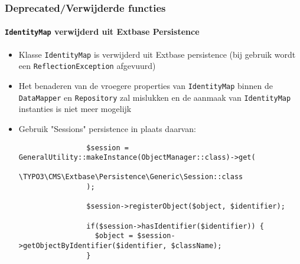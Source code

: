 \begin{frame}[fragile]
	\frametitle{Deprecated/Verwijderde functies}
	\framesubtitle{\texttt{IdentityMap} verwijderd uit Extbase Persistence}

	\lstset{basicstyle=\tiny\ttfamily}

	\begin{itemize}

		\item Klasse \texttt{IdentityMap} is verwijderd uit Extbase persistence\newline
			\small(bij gebruik wordt een \texttt{ReflectionException} afgevuurd)\normalsize

		\item Het benaderen van de vroegere properties van \texttt{IdentityMap} binnen de
			\texttt{DataMapper} en \texttt{Repository} zal mislukken en de aanmaak van
			\texttt{IdentityMap} instanties is niet meer mogelijk

		\item Gebruik "Sessions" persistence in plaats daarvan:

			\begin{lstlisting}
				$session = GeneralUtility::makeInstance(ObjectManager::class)->get(
				  \TYPO3\CMS\Extbase\Persistence\Generic\Session::class
				);

				$session->registerObject($object, $identifier);

				if($session->hasIdentifier($identifier)) {
				  $object = $session->getObjectByIdentifier($identifier, $className);
				}
			\end{lstlisting}

	\end{itemize}

\end{frame}


